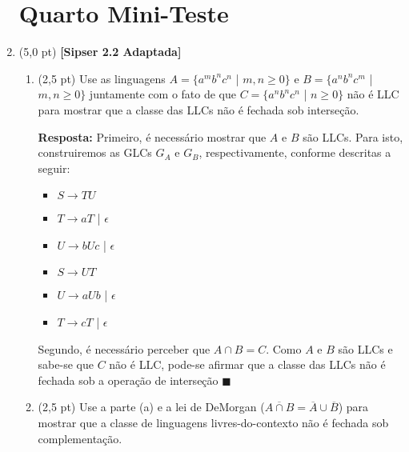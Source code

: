 \documentclass[12pt,a4paper,oneside]{article}
\begin{document}
\begin{enumerate}
	
	\section*{Quarto Mini-Teste}
	
	\item (5,0 pt) {\bf [Sipser 2.2 Adaptada]} 
	\begin{enumerate}
		\item (2,5 pt) Use as linguagens $A = \{a^m b^n c^n$ | $m, n \geq 0\}$ e $B = \{a^n b^n c^m$ | $m, n \geq 0\}$ juntamente com o fato de que $C = \{a^n b^n c^n$ | $n \geq 0\}$ não é LLC para mostrar que a classe das LLCs não é fechada sob interseção.
		
		\vspace*{0.3cm}
		
		{\color{blue} {\bf Resposta:} Primeiro, é necessário mostrar que $A$ e $B$ são LLCs. Para isto, construiremos as GLCs $G_A$ e $G_B$, respectivamente, conforme descritas a seguir:
			
			\begin{itemize}
				\item[] $S \rightarrow TU$
				\item[] $T \rightarrow aT$ | $\epsilon$
				\item[] $U \rightarrow bUc$ | $\epsilon$
			\end{itemize}
		
		\begin{itemize}
			\item[] $S \rightarrow UT$
			\item[] $U \rightarrow aUb$ | $\epsilon$
			\item[] $T \rightarrow cT$ | $\epsilon$
		\end{itemize}
	
		Segundo, é necessário perceber que $A \cap B = C$. Como $A$ e $B$ são LLCs e sabe-se que $C$ não é LLC, pode-se afirmar que a classe das LLCs não é fechada sob a operação de interseção $\blacksquare$
		}
	
		\item (2,5 pt) Use a parte (a) e a lei de DeMorgan ($\overline{A \cap B} = \overline{A} \cup \overline{B}$) para mostrar que a classe de linguagens livres-do-contexto não é fechada sob complementação.
		
		\vspace*{0.3cm}
		

\end{enumerate}
\end{enumerate}
\end{document}
